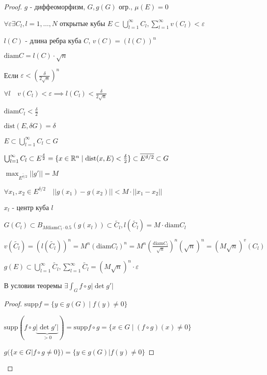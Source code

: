 \begin{proof}
    $g$ - диффеоморфизм, $G, g(G)$ огр., $\mu(E)=0$

    $\forall \varepsilon \exists C_l, l=1,\dotsc, N $ открытые кубы $E \subset 
    \bigcup^\infty_{l=1}C_l, \sum^\infty_{l=1}v(C_l) < \varepsilon$

    $l(C)$ - длина ребра куба $C$, $v(C) = (l(C))^n$

    $\text{diam} C = l(C) \cdot \sqrt{n}$

    Если $\varepsilon < (\frac{\delta}{2\sqrt{n}})^n $
    
    $\forall l \quad v(C_l) < \varepsilon \implies l(C_l) < \frac{\delta}{2\sqrt{n}}$

    $\text{diam} C_l < \frac{\delta}{2}$

    $\text{dist} (E, \delta G) = \delta$

    $E \subset \bigcup^\infty_{l=1}C_l \subset G$

    $\bigcup^\infty_{l=1} C_l \subset E^{\frac{\delta}{2}} = 
    \{  x \in \mathbb{R}^n \mid \text{dist}(x,E) < \frac{\delta}{2} \} \subset 
    \overline{E^{\delta /2}} \subset G$

    $\max_{\overline{E^{\delta / 2}}} ||g'|| = M$

    $\forall x_1, x_2 \in E^{\delta / 2} \quad || g(x_1) - g(x_2) || < M \cdot ||x_1 - x_2||$
    
    \quad $x_l$ - центр куба $l$
    
    $G(C_l) \subset B_{M \text{diam}C_l \cdot 0.5} (g(x_l)) \subset \widetilde{C_l},
    l(\widetilde{C_l}) = M \cdot \text{diam}C_l$

    $v(\widetilde{C_l}) = (l(\widetilde{C_l}))^n = M^n (\text{diam}C_l)^n = 
    M^n (\frac{\text{diam}C_l}{\sqrt{n}})^n (\sqrt{n})^n = (M\sqrt{n})^ v(C_l)
    $

    $g(E) \subset \bigcup^\infty_{l=1}\widetilde{C_l}, 
    \sum^\infty_{l=1}\widetilde{C_l} = (M\sqrt{n})^n\cdot \varepsilon$ 

    \begin{remark}
        В условии теоремы $\exists \int_G f \circ g | \det g' |$
    \end{remark}
    \begin{proof}
        $\text{supp} f = \{ y \in g(G) \mid f(y) \neq 0\}$

        $\text{supp} (f\circ g \underbrace{| \det g' |}_{>0}) = \text{supp}f\circ g = 
        \{ x \in G \mid (f \circ g)(x) \neq 0 \}
        $

        $g(\{ x \in G | f \circ g \neq 0 \}) = \{ y \in g(G) | f(y) \neq 0\}$


\end{proof}
\end{proof}
